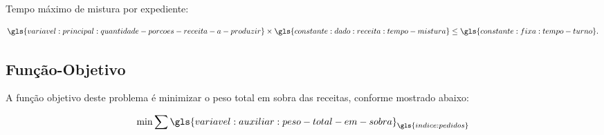 Tempo máximo de mistura por expediente:

\begin{align}
    \gls{variavel:principal:quantidade-porcoes-receita-a-produzir}
    \times \gls{constante:dado:receita:tempo-mistura}
    \leq \gls{constante:fixa:tempo-turno}.
\end{align}

\subsection{Função-Objetivo}

A função objetivo deste problema é minimizar o peso total em sobra das receitas, conforme mostrado abaixo:

\begin{align}
    \min \sum \gls{variavel:auxiliar:peso-total-em-sobra}_{\gls{indice:pedidos}}
\end{align}
